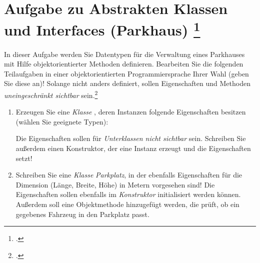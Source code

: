 \documentclass{lehramt-informatik-aufgabe}
\begin{document}

\section{Aufgabe zu Abstrakten Klassen und Interfaces (Parkhaus)
\footcite[Thema 2 Teilaufgabe 2 Aufgabe 1 Seite 11]{examen:66116:2014:03}
}

In dieser Aufgabe werden Sie Datentypen für die Verwaltung eines
Parkhauses mit Hilfe objektorientierter Methoden definieren. Bearbeiten
Sie die folgenden Teilaufgaben in einer objektorientierten
Programmiersprache Ihrer Wahl (geben Sie diese an)! Solange nicht anders
definiert, sollen Eigenschaften und Methoden \emph{uneingeschränkt
sichtbar} sein.\footcite{aud:ab:1}

\begin{enumerate}


\item Erzeugen Sie eine \emph{Klasse}
, deren Instanzen folgende Eigenschaften besitzen (wählen
Sie geeignete Typen):


Die Eigenschaften sollen für \emph{Unterklassen nicht sichtbar} sein.
Schreiben Sie außerdem einen Konstruktor, der eine Instanz erzeugt und
die Eigenschaften setzt!

\begin{liAntwort}
\end{liAntwort}


\item Schreiben Sie eine \emph{Klasse} \emph{Parkplatz}, in der
ebenfalls Eigenschaften für die Dimension (Länge, Breite, Höhe) in
Metern vorgesehen sind! Die Eigenschaften sollen ebenfalls im
\emph{Konstruktor} initialisiert werden können. Außerdem soll eine
Objektmethode hinzugefügt werden, die prüft, ob ein gegebenes Fahrzeug
in den Parkplatz passt.


\end{enumerate}
\end{document}
